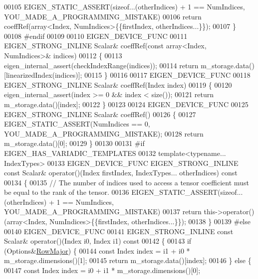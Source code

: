 \begin{DoxyCode}
00105       EIGEN\_STATIC\_ASSERT(\textcolor{keyword}{sizeof}...(otherIndices) + 1 == NumIndices, YOU\_MADE\_A\_PROGRAMMING\_MISTAKE)
00106       \textcolor{keywordflow}{return} coeffRef(array<Index, NumIndices>\{\{firstIndex, otherIndices...\}\});
00107     \}
00108 \textcolor{preprocessor}{#endif}
00109 
00110     EIGEN\_DEVICE\_FUNC
00111     EIGEN\_STRONG\_INLINE Scalar& coeffRef(\textcolor{keyword}{const} array<Index, NumIndices>& indices)
00112     \{
00113       eigen\_internal\_assert(checkIndexRange(indices));
00114       \textcolor{keywordflow}{return} m\_storage.data()[linearizedIndex(indices)];
00115     \}
00116 
00117     EIGEN\_DEVICE\_FUNC
00118     EIGEN\_STRONG\_INLINE Scalar& coeffRef(Index index)
00119     \{
00120       eigen\_internal\_assert(index >= 0 && index < size());
00121       \textcolor{keywordflow}{return} m\_storage.data()[index];
00122     \}
00123 
00124     EIGEN\_DEVICE\_FUNC
00125     EIGEN\_STRONG\_INLINE Scalar& coeffRef()
00126     \{
00127       EIGEN\_STATIC\_ASSERT(NumIndices == 0, YOU\_MADE\_A\_PROGRAMMING\_MISTAKE);
00128       \textcolor{keywordflow}{return} m\_storage.data()[0];
00129     \}
00130 
00131 \textcolor{preprocessor}{#if EIGEN\_HAS\_VARIADIC\_TEMPLATES}
00132     \textcolor{keyword}{template}<\textcolor{keyword}{typename}... IndexTypes>
00133     EIGEN\_DEVICE\_FUNC EIGEN\_STRONG\_INLINE \textcolor{keyword}{const} Scalar& operator()(Index firstIndex, IndexTypes... 
      otherIndices)\textcolor{keyword}{ const}
00134 \textcolor{keyword}{    }\{
00135       \textcolor{comment}{// The number of indices used to access a tensor coefficient must be equal to the rank of the tensor.}
00136       EIGEN\_STATIC\_ASSERT(\textcolor{keyword}{sizeof}...(otherIndices) + 1 == NumIndices, YOU\_MADE\_A\_PROGRAMMING\_MISTAKE)
00137       \textcolor{keywordflow}{return} this->operator()(array<Index, NumIndices>\{\{firstIndex, otherIndices...\}\});
00138     \}
00139 \textcolor{preprocessor}{#else}
00140     EIGEN\_DEVICE\_FUNC
00141     EIGEN\_STRONG\_INLINE \textcolor{keyword}{const} Scalar& operator()(Index i0, Index i1)\textcolor{keyword}{ const}
00142 \textcolor{keyword}{    }\{
00143       \textcolor{keywordflow}{if} (Options&\hyperlink{group__enums_ggaacded1a18ae58b0f554751f6cdf9eb13acfcde9cd8677c5f7caf6bd603666aae3}{RowMajor}) \{
00144         \textcolor{keyword}{const} Index index = i1 + i0 * m\_storage.dimensions()[1];
00145         \textcolor{keywordflow}{return} m\_storage.data()[index];
00146       \} \textcolor{keywordflow}{else} \{
00147         \textcolor{keyword}{const} Index index = i0 + i1 * m\_storage.dimensions()[0];

\end{DoxyCode}
